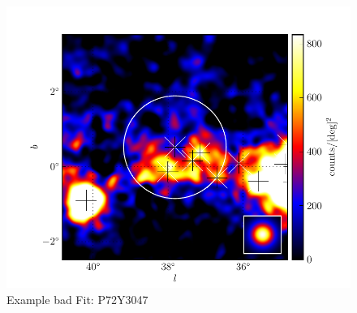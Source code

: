 \documentclass[12pt,preprint]{aastex}
\begin{document}
\clearpage
\begin{figure}
  \begin{center}
    \includegraphics{source_plots/example_bad_fit.pdf}
    \caption{Example bad Fit: P72Y3047
    }
    \label{example_bad_fit}
  \end{center}
\end{figure}
\end{document}
